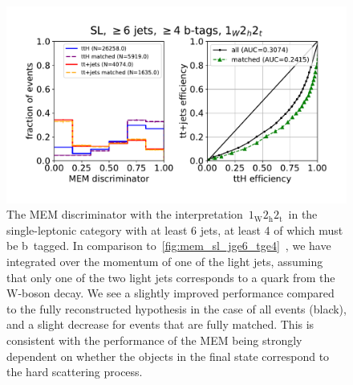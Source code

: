 \begin{figure}
\begin{centering}
\includegraphics[width = 1.0\textwidth]{figures/mem_sl_jge6_tge4_1w2h2t.pdf}
\caption{The MEM discriminator with the interpretation~$1_{\mathrm{W}} 2_{\mathrm{h}} 2_{\mathrm{t}}$~in the single-leptonic category with at least 6 jets, at least 4 of which must be b~tagged. In comparison to~\cref{fig:mem_sl_jge6_tge4}~, we have integrated over the momentum of one of the light jets, assuming that only one of the two light jets corresponds to a quark from the~$\mathrm{W}$-boson decay. We see a slightly improved performance compared to the fully reconstructed hypothesis in the case of all events (black), and a slight decrease for events that are fully matched. This is consistent with the performance of the MEM being strongly dependent on whether the objects in the final state correspond to the hard scattering process.}
\label{fig:mem_sl_jge6_tge4_1w2h2t}
\end{centering}
\end{figure}

